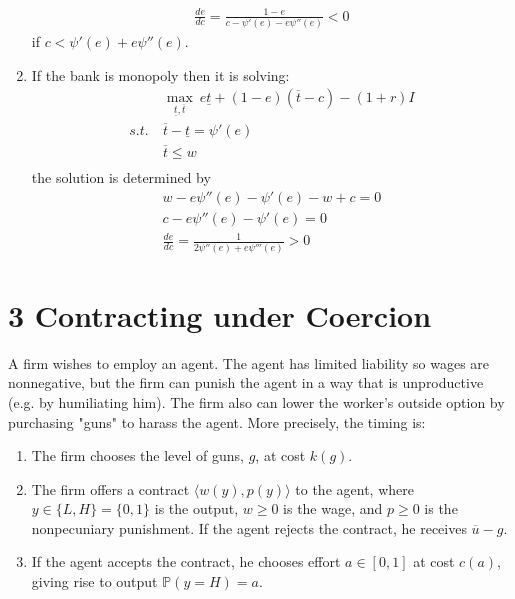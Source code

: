 \documentclass[a4paper]{article}
\newcommand{\prob}{\mathbb{P}}
\newcommand{\ubar}{\overline}
\newcommand{\lbar}{\underline}
\begin{document}
\begin{enumerate}
	\begin{align*}
	\frac{de}{dc} = \frac{1-e}{c - \psi'(e) - e\psi''(e)} < 0
	\end{align*}
	if $c < \psi'(e) + e\psi''(e)$.
	\item If the bank is monopoly then it is solving:
	\begin{align*}
	&\underset{\lbar{t}, \ubar{t}}{\max}\ e \lbar{t} + (1 -e)(\ubar{t} - c) - (1 +r)I\\
	s.t.\ &\ubar{t} - \lbar{t} = \psi'(e)\\
	&\ubar{t} \le w\\
	\end{align*}
	the solution is determined by
	\begin{align*}
	w - e \psi''(e) - \psi'(e) - w + c = 0\\
	c - e \psi''(e) - \psi'(e) = 0\\
	\frac{de}{dc} = \frac{1}{2\psi''(e) + e\psi'''(e)} > 0
	\end{align*}
	\end{enumerate}
\section*{3 Contracting under Coercion}
	A firm wishes to employ an agent. The agent has limited liability so wages are
	nonnegative, but the firm can punish the agent in a way that is unproductive (e.g. by
	humiliating him). The firm also can lower the worker's outside option by purchasing
	"guns" to harass the agent. More precisely, the timing is:
	\begin{enumerate}
	\item The firm chooses the level of guns, $g$, at cost $k(g)$.
	\item The firm offers a contract $\langle w(y), p(y)\rangle$ to the agent, where $y \in \{L, H\} = \{0, 1\}$ is the output, $w \ge 0$ is the wage, and $p \ge 0$ is the nonpecuniary punishment. If the
	agent rejects the contract, he receives $\ubar{u}-g$.
	\item If the agent accepts the contract, he chooses effort $a \in [0, 1]$ at cost $c(a)$, giving rise
	to output $\prob (y = H) = a$.
	\end{enumerate}
\end{document}
